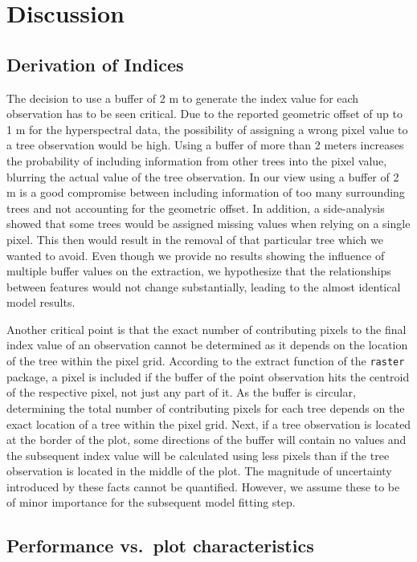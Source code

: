 \documentclass[letterpaper, peerreview]{IEEEtran}
\begin{document}
\section{Discussion}

\subsection{Derivation of Indices}

\noindent The decision to use a buffer of 2 m to generate the index value for each observation has to be seen critical.
Due to the reported geometric offset of up to 1 m for the hyperspectral data, the possibility of assigning a wrong pixel value to a tree observation would be high.
Using a buffer of more than 2 meters increases the probability of including information from other trees into the pixel value, blurring the actual value of the tree observation.
In our view using a buffer of 2 m is a good compromise between including information of too many surrounding trees and not accounting for the geometric offset.
In addition, a side-analysis showed that some trees would be assigned missing values when relying on a single pixel.
This then would result in the removal of that particular tree which we wanted to avoid.
Even though we provide no results showing the influence of multiple buffer values on the extraction, we hypothesize that the relationships between features would not change substantially, leading to the almost identical model results.

Another critical point is that the exact number of contributing pixels to the final index value of an observation cannot be determined as it depends on the location of the tree within the pixel grid.
According to the extract function of the \texttt{raster} package, a pixel is included if the buffer of the point observation hits the centroid of the respective pixel, not just any part of it.
As the buffer is circular, determining the total number of contributing pixels for each tree depends on the exact location of a tree within the pixel grid.
Next, if a tree observation is located at the border of the plot, some directions of the buffer will contain no values and the subsequent index value will be calculated using less pixels than if the tree observation is located in the middle of the plot.
The magnitude of uncertainty introduced by these facts cannot be quantified.
However, we assume these to be of minor importance for the subsequent model fitting step.

\subsection{Performance vs.\ plot characteristics}
\label{subsec:perf-plot-char}
\end{document}
